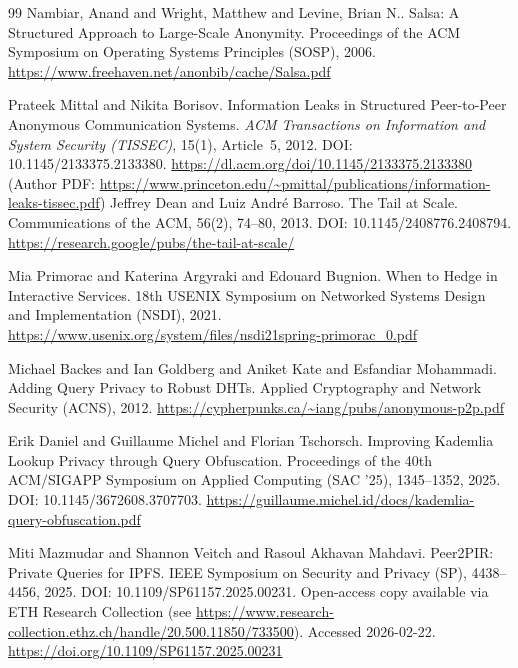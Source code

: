 \documentclass[11pt]{article}
\begin{document}
\begin{thebibliography}{99}
Nambiar, Anand and Wright, Matthew and Levine, Brian N..
\newblock Salsa: A Structured Approach to Large-Scale Anonymity.
\newblock Proceedings of the ACM Symposium on Operating Systems Principles (SOSP), 2006.
\newblock \url{https://www.freehaven.net/anonbib/cache/Salsa.pdf}

Prateek Mittal and Nikita Borisov.
\newblock Information Leaks in Structured Peer-to-Peer Anonymous Communication Systems.
\newblock \emph{ACM Transactions on Information and System Security (TISSEC)}, 15(1), Article~5, 2012.
\newblock DOI: 10.1145/2133375.2133380.
\newblock \url{https://dl.acm.org/doi/10.1145/2133375.2133380}
\newblock (Author PDF: \url{https://www.princeton.edu/~pmittal/publications/information-leaks-tissec.pdf})
Jeffrey Dean and Luiz Andr{\'e} Barroso.
\newblock The Tail at Scale.
\newblock Communications of the ACM, 56(2), 74--80, 2013.
\newblock DOI: 10.1145/2408776.2408794.
\newblock \url{https://research.google/pubs/the-tail-at-scale/}

Mia Primorac and Katerina Argyraki and Edouard Bugnion.
\newblock When to Hedge in Interactive Services.
\newblock 18th {USENIX} Symposium on Networked Systems Design and Implementation ({NSDI}), 2021.
\newblock \url{https://www.usenix.org/system/files/nsdi21spring-primorac_0.pdf}

Michael Backes and Ian Goldberg and Aniket Kate and Esfandiar Mohammadi.
\newblock Adding Query Privacy to Robust {DHT}s.
\newblock Applied Cryptography and Network Security (ACNS), 2012.
\newblock \url{https://cypherpunks.ca/~iang/pubs/anonymous-p2p.pdf}

Erik Daniel and Guillaume Michel and Florian Tschorsch.
\newblock Improving Kademlia Lookup Privacy through Query Obfuscation.
\newblock Proceedings of the 40th {ACM/SIGAPP} Symposium on Applied Computing (SAC '25), 1345--1352, 2025.
\newblock DOI: 10.1145/3672608.3707703.
\newblock \url{https://guillaume.michel.id/docs/kademlia-query-obfuscation.pdf}

Miti Mazmudar and Shannon Veitch and Rasoul Akhavan Mahdavi.
\newblock Peer2PIR: Private Queries for {IPFS}.
\newblock IEEE Symposium on Security and Privacy (SP), 4438--4456, 2025.
\newblock DOI: 10.1109/SP61157.2025.00231.
\newblock Open-access copy available via ETH Research Collection (see \url{https://www.research-collection.ethz.ch/handle/20.500.11850/733500}). Accessed 2026-02-22.
\newblock \url{https://doi.org/10.1109/SP61157.2025.00231}


\end{thebibliography}
\end{document}
